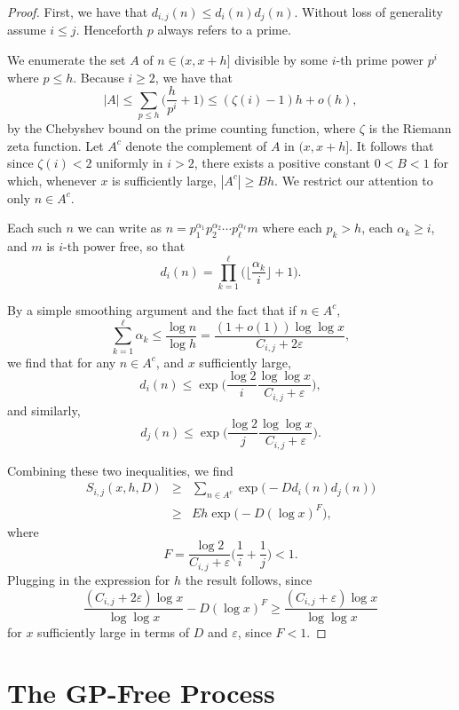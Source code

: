 \documentclass[12pt,english,BCOR7.5mm]{amsart}
\numberwithin{equation}{section}
\numberwithin{figure}{section}
\theoremstyle{definition}
\theoremstyle{plain}
\theoremstyle{plain}
\theoremstyle{plain}
\theoremstyle{definition}
\theoremstyle{plain}
\theoremstyle{plain}
\begin{document}
\begin{proof}
First, we have that $d_{i,j}(n)\leq d_{i}(n)d_{j}(n)$. Without loss
of generality assume $i\leq j$. Henceforth $p$ always refers to
a prime.

We enumerate the set $A$ of $n\in(x,x+h]$ divisible by some $i$-th
prime power $p^{i}$ where $p\leq h$. Because $i\geq2$, we have
that
\[
|A|\leq\sum_{p\leq h}\Big(\frac{h}{p^{i}}+1\Big)\leq(\zeta(i)-1)h+o(h),
\]
by the Chebyshev bound on the prime counting function, where $\zeta$
is the Riemann zeta function. Let $A^{c}$ denote the complement of
$A$ in $(x,x+h]$. It follows that since $\zeta(i)<2$ uniformly
in $i>2$, there exists a positive constant $0<B<1$ for which, whenever
$x$ is sufficiently large, $|A^{c}|\geq Bh$. We restrict our attention
to only $n\in A^{c}$.

Each such $n$ we can write as $n=p_{1}^{\alpha_{1}}p_{2}^{\alpha_{2}}\cdots p_{\ell}^{\alpha_{\ell}}m$
where each $p_{k}>h$, each $\alpha_{k}\geq i$, and $m$ is $i$-th
power free, so that 
\[
d_{i}(n)=\prod_{k=1}^{\ell}\Big(\Big\lfloor\frac{\alpha_{k}}{i}\Big\rfloor+1\Big).
\]

By a simple smoothing argument and the fact that if $n\in A^{c}$,
\[
\sum_{k=1}^{\ell}\alpha_{k}\leq\frac{\log n}{\log h}=\frac{(1+o(1))\log\log x}{C_{i,j}+2\varepsilon},
\]
we find that for any $n\in A^{c}$, and $x$ sufficiently large,
\[
d_{i}(n)\leq\exp\Big(\frac{\log2}{i}\frac{\log\log x}{C_{i,j}+\varepsilon}\Big),
\]
and similarly,
\[
d_{j}(n)\leq\exp\Big(\frac{\log2}{j}\frac{\log\log x}{C_{i,j}+\varepsilon}\Big).
\]

Combining these two inequalities, we find
\begin{eqnarray*}
S_{i,j}(x,h,D) & \geq & \sum_{n\in A^{c}}\exp\Big(-Dd_{i}(n)d_{j}(n)\Big)\\
 & \geq & Eh\exp\Big(-D(\log x)^{F}\Big),
\end{eqnarray*}
where 
\[
F=\frac{\log2}{C_{i,j}+\varepsilon}\Big(\frac{1}{i}+\frac{1}{j}\Big)<1.
\]
Plugging in the expression for $h$ the result follows, since
\[
\frac{(C_{i,j}+2\varepsilon)\log x}{\log\log x}-D(\log x)^{F}\geq\frac{(C_{i,j}+\varepsilon)\log x}{\log\log x}
\]
for $x$ sufficiently large in terms of $D$ and $\varepsilon$, since
$F<1$.
\end{proof}

\section*{The GP-Free Process}
\end{document}
